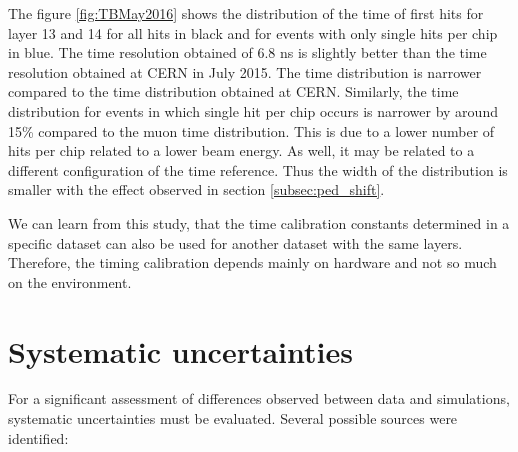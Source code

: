 The figure \ref{fig:TBMay2016} shows the distribution of the time of first hits for layer 13 and 14 for all hits in black and for events with only single hits per chip in blue. The time resolution obtained of 6.8 ns is slightly better than the time resolution obtained at CERN in July 2015. The time distribution is narrower compared to the time distribution obtained at CERN. Similarly, the time distribution for events in which single hit per chip occurs is narrower by around 15\% compared to the muon time distribution. This is due to a lower number of hits per chip related to a lower beam energy. As well, it may be related to a different configuration of the time reference. Thus the width of the distribution is smaller with the effect observed in section \ref{subsec:ped_shift}.

We can learn from this study, that the time calibration constants determined in a specific dataset can also be used for another dataset with the same layers. Therefore, the timing calibration depends mainly on hardware and not so much on the environment.

\section{Systematic uncertainties}

For a significant assessment of differences observed between data and simulations, systematic uncertainties must be evaluated. Several possible sources were identified:


